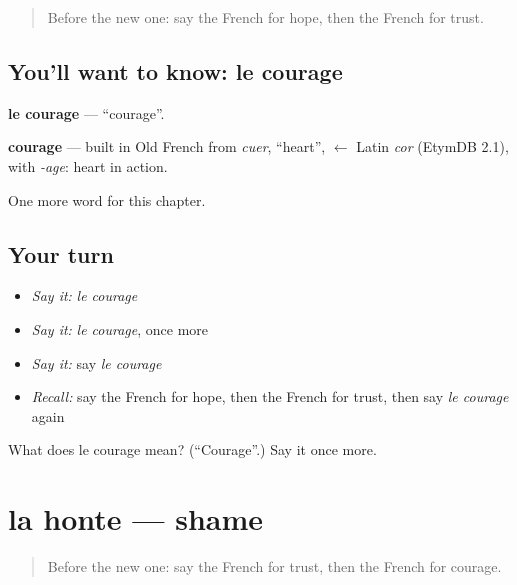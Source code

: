 \label{lesson:FR-C186-courage}



\begin{quote}
Before the new one: say the French for hope, then the French for trust.
\end{quote}

\subsection*{You'll want to know: le courage}
\textbf{le courage} — \textquotedblleft{}courage\textquotedblright{}.

\begin{cousinweb}
\textbf{courage} — built in Old French from \emph{cuer}, \textquotedblleft{}heart\textquotedblright{}, $\leftarrow$ Latin \emph{cor} (EtymDB 2.1), with \emph{-age}: heart in action.
\end{cousinweb}

\begin{grammarlens}[title={What you've built}]
One more word for this chapter.
\end{grammarlens}

\subsection*{Your turn}
\begin{itemize}
\raggedright
  \item \emph{Say it:} \emph{le courage}
  \item \emph{Say it:} \emph{le courage}, once more
  \item \emph{Say it:} say \emph{le courage}
  \item \emph{Recall:} say the French for hope, then the French for trust, then say \emph{le courage} again
\end{itemize}

\begin{tcolorbox}[breakable,colback=teal!4,colframe=teal!35!black,title={Before you move on}]
What does le courage mean? (\textquotedblleft{}Courage\textquotedblright{}.) Say it once more.
\end{tcolorbox}
\section[la honte]{la honte — shame}

\label{lesson:FR-C186-honte}



\begin{quote}
Before the new one: say the French for trust, then the French for courage.
\end{quote}

